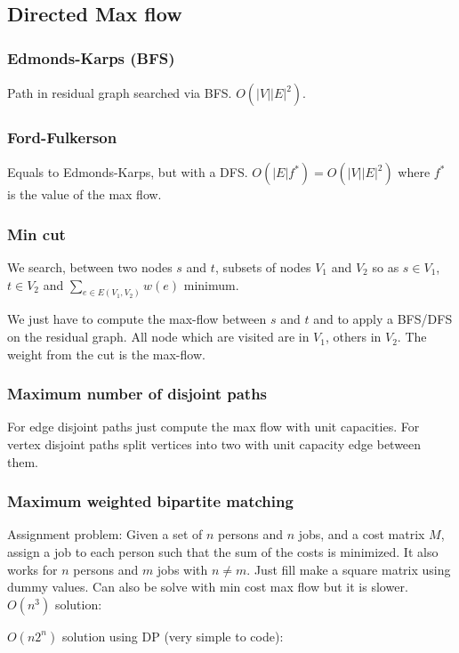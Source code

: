 \subsection{Directed Max flow}
\subsubsection{Edmonds-Karps (BFS)}
Path in residual graph searched via BFS. $O(|V||E|^2)$.


\subsubsection{Ford-Fulkerson}
Equals to Edmonds-Karps, but with a DFS. $O(|E|f^*)=O(|V||E|^2)$ where $f^*$ is the value of the max flow.


\subsubsection{Min cut}
We search, between two nodes $s$ and $t$, subsets of nodes $V_1$ and $V_2$ so as $s\in V_1$, $t\in V_2$ and $\sum_{e \in E(V_1, V_2)} w(e)$ minimum.

We just have to compute the max-flow between $s$ and $t$ and to apply a BFS/DFS on the residual graph. All node which are visited are in $V_1$, others in $V_2$. The weight from the cut is the max-flow.

\subsubsection{Maximum number of disjoint paths} 
For edge disjoint paths just compute the max flow with unit capacities. For vertex disjoint paths split vertices into two with unit capacity edge between them.

\subsubsection{Maximum weighted bipartite matching}
Assignment problem: Given a set of $n$ persons and $n$ jobs, and a cost matrix $M$, assign a job to each person such that the sum of the costs is minimized. It also works for $n$ persons and $m$ jobs with $n \neq m$. Just fill make a square matrix using dummy values. Can also be solve with min cost max flow but it is slower. \\

$O(n^3)$ solution:

\vspace{0.5cm}
$O(n 2^n)$ solution using DP (very simple to code):


